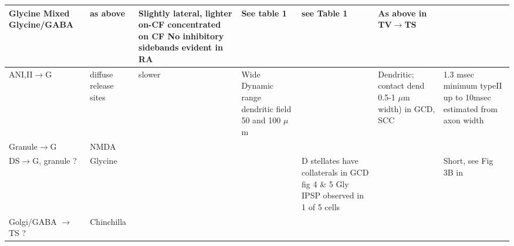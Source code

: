 \documentclass[10pt,a4paper]{article}
\newcommand{\um}{$\mu$m}
\begin{document}
\begin{landscape}
\begin{supertabular}{|m{2.121cm}|m{2.899cm}|m{2.243cm}|m{2.986cm}|m{2.294cm}|m{2.245cm}|m{3.303cm}|}
Glycine \citep{OstapoffMorestEtAl:1999,SaintBensonEtAl:1991} Mixed
               Glycine/GABA \citep{OsenOttersenEtAl:1990}                 & \citep{OstapoffMorestEtAl:1999}
                                as above                                  & Slightly lateral, lighter on-CF \citep{OstapoffMorestEtAl:1999}
concentrated on CF \citep{ZhangOertel:1993} No inhibitory sidebands evident
                                  in RA                                   &    See table 1 \citep{SmithRhode:1989}     & see Table 1
                         \citep{SmithRhode:1989}                          & As above in TV\ensuremath{\rightarrow}TS\\\hline
                     ANI,II\ensuremath{\rightarrow}G                      & 
\citep{Cant:1992,FerragamoGoldingEtAl:1998a,RyugoWrightEtAl:1993,Ryugo:1992,RyugoParks:2003}
            diffuse release sites \citep{HurdHutsonEtAl:1999}             & 
   \citep{GardnerTrussellEtAl:1999} slower \citep{HurdHutsonEtAl:1999}    & Wide
Dynamic range \citep{GhoshalKim:1997} dendritic field 50 and 100 $\mu $m
                   \citep{FerragamoGoldingEtAl:1998a}                     &                                            & Dendritic; contact dend 0.5-1 \um
               width) in GCD, SCC \citep{BensonBrown:2004}                & 1.3 msec minimum
\citep{FerragamoGoldingEtAl:1998a} typeII up to 10msec estimated from axon
width \citep{Brown:1993}\\\hline
                    Granule\ensuremath{\rightarrow}G                      & NMDA
                   \citep{FerragamoGoldingEtAl:1998a}                     &      \citep{GardnerTrussellEtAl:1999}      &   & 
                   \citep{FerragamoGoldingEtAl:1998a}                     &                                            & \\\hline
DS\ensuremath{\rightarrow}G,
                                granule ?                                 &                  Glycine                   & 

                                                                          &                                            & D stellates have collaterals in GCD fig 4 \& 5 \citep{OertelWuEtAl:1990}
   Gly IPSP observed in 1 of 5 cells \citep{FerragamoGoldingEtAl:1998}    &                                            & 
Short, see Fig 3B in \citep{FerragamoGoldingEtAl:1998}\\\hline
Golgi/GABA
                      \ensuremath{\rightarrow}TS ?                        & Chinchilla
         \citep{FerragamoGoldingEtAl:1998,JosephsonMorest:1998}           & 


\end{supertabular}
\end{landscape}
\end{document}
